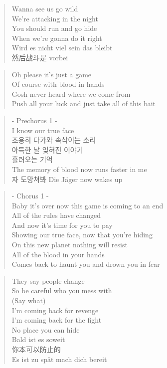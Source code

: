 \begin{verse}
Wanna see us go wild \\
We're attacking in the night\\
You should run and go hide\\
When we're gonna do it right\\
Wird es nicht viel sein das bleibt\\
然后战斗是 vorbei
\end{verse}

\begin{verse}
Oh please it's just a game\\
Of course with blood in hands\\
Gosh never heard where we come from\\
Push all your luck and just take all of this bait 
\end{verse}

\begin{verse}
- Prechorus 1 -\\
I know our true face\\
조용히 \ks 다가와 \ks 속삭이는 \ks 소리\\
아득한 \ks 날 \ks 잊혀진 \ks 이야기 \\
흘러오는 \ks 기억 \\
The memory of blood now runs faster in me\\
자 도망쳐봐 Die Jäger now wakes up
\end{verse}

\begin{verse}
- Chorus 1 -\\
Baby it's over now this game is coming to an end\\
All of the rules have changed \\
And now it's time for you to pay\\
Showing our true face, now that you're hiding \\
On this new planet nothing will resist \\
All of the blood in your hands\\
Comes back to haunt you and drown you in fear\\
\end{verse}

\clearpage
{}

\begin{verse}
They say people change\\
So be careful who you mess with \\
(Say what)\\
I'm coming back for revenge\\
I'm coming back for the fight\\
No place you can hide\\
Bald ist es soweit\\
你本可以防止的\\
Es ist zu spät mach dich bereit 
\end{verse}

